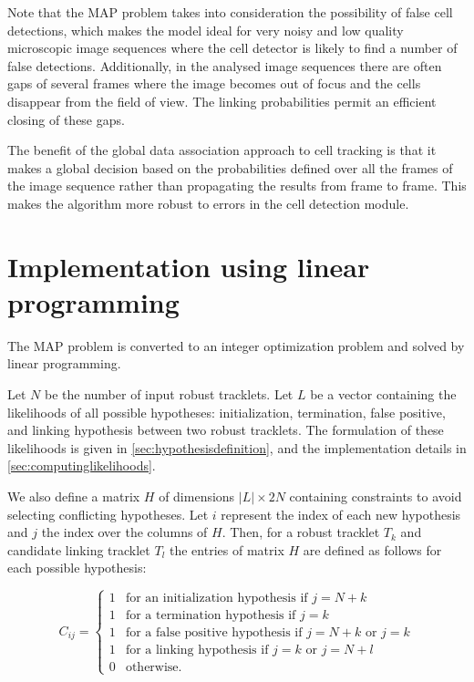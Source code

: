   	 	Note that the MAP problem takes into consideration the possibility of false cell detections, which makes the model ideal for very noisy and low quality microscopic image sequences where the cell detector is likely to find a number of false detections. Additionally, in the analysed image sequences there are often gaps of several frames where the image becomes out of focus and the cells disappear from the field of view. The linking probabilities permit an efficient closing of these gaps.
  	 	
  	 	The benefit of the global data association approach to cell tracking is that it makes a global decision based on the probabilities defined over all the frames of the image sequence rather than propagating the results from frame to frame. This makes the algorithm more robust to errors in the cell detection module.
  	 	
	\section{Implementation using linear programming}
		\label{sec:tracking_linearprogramming}
		The MAP problem is converted to an integer optimization problem and solved by linear programming.
		
		Let $N$ be the number of input robust tracklets. Let $L$ be a vector containing the likelihoods of all possible hypotheses: initialization, termination, false positive, and linking hypothesis between two robust tracklets. The formulation of these likelihoods is given in \cref{sec:hypothesisdefinition}, and the implementation details in \cref{sec:computinglikelihoods}.
		
		We also define a matrix $H$ of dimensions $|L| \times 2N$ containing constraints to avoid selecting conflicting hypotheses. Let $i$ represent the index of each new hypothesis and $j$ the index over the columns of $H$. Then, for a robust tracklet $T_k$ and candidate linking tracklet $T_l$ the entries of matrix $H$ are defined as follows for each possible hypothesis:
		
		\[
			C_{ij} = \begin{cases}
			1 & \text{for an initialization hypothesis if } j = N + k \\
			1 & \text{for a termination hypothesis if } j = k \\
			1 & \text{for a false positive hypothesis if } j = N + k \text{ or } j = k \\
			1 & \text{for a linking hypothesis if } j = k \text{ or } j = N + l \\
			0 & \text{otherwise.}
			\end{cases}
		\]
		
